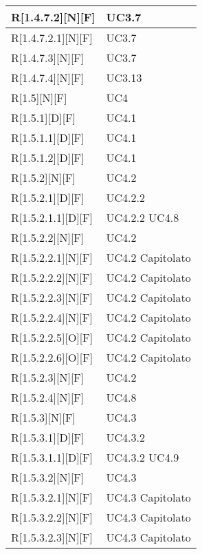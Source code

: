 \begin{longtable}{X | X}
\hline
R[1.4.7.2][N][F] & UC3.7 \\
\hline
R[1.4.7.2.1][N][F] & UC3.7 \\
\hline
R[1.4.7.3][N][F] & UC3.7 \\
\hline
R[1.4.7.4][N][F] & UC3.13 \\
\hline
R[1.5][N][F] & UC4 \\
\hline
R[1.5.1][D][F] & UC4.1 \\
\hline
R[1.5.1.1][D][F] & UC4.1 \\
\hline
R[1.5.1.2][D][F] & UC4.1 \\
\hline
R[1.5.2][N][F] & UC4.2 \\
\hline
R[1.5.2.1][D][F] & UC4.2.2 \\
\hline
R[1.5.2.1.1][D][F] & UC4.2.2 \newline UC4.8 \\
\hline
R[1.5.2.2][N][F] & UC4.2 \\
\hline
R[1.5.2.2.1][N][F] & UC4.2 \newline Capitolato \\
\hline
R[1.5.2.2.2][N][F] & UC4.2 \newline Capitolato \\
\hline
R[1.5.2.2.3][N][F] & UC4.2 \newline Capitolato \\
\hline
R[1.5.2.2.4][N][F] & UC4.2 \newline Capitolato \\
\hline
R[1.5.2.2.5][O][F] & UC4.2 \newline Capitolato \\
\hline
R[1.5.2.2.6][O][F] & UC4.2 \newline Capitolato \\
\hline
R[1.5.2.3][N][F] & UC4.2 \\
\hline
R[1.5.2.4][N][F] & UC4.8 \\
\hline
R[1.5.3][N][F] & UC4.3 \\
\hline
R[1.5.3.1][D][F] & UC4.3.2 \\
\hline
R[1.5.3.1.1][D][F] & UC4.3.2 \newline UC4.9 \\
\hline
R[1.5.3.2][N][F] & UC4.3 \\
\hline
R[1.5.3.2.1][N][F] & UC4.3 \newline Capitolato \\
\hline
R[1.5.3.2.2][N][F] & UC4.3 \newline Capitolato \\
\hline
R[1.5.3.2.3][N][F] & UC4.3 \newline Capitolato \\

\end{longtable}
